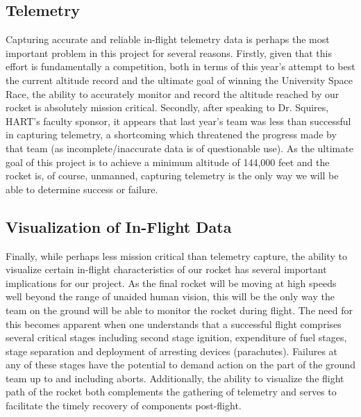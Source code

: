 \documentclass[onecolumn, draftclsnofoot,10pt, compsoc]{IEEEtran}
\begin{document}
\subsection{Telemetry}
Capturing accurate and reliable in-flight telemetry data is perhaps the most important problem in this project for several reasons. 
Firstly, given that this effort is fundamentally a competition, both in terms of this year's attempt to best the current altitude record and the ultimate goal of winning the University Space Race, the ability to accurately monitor and record the altitude reached by our rocket is absolutely mission critical. 
Secondly, after speaking to Dr. Squires, HART's faculty sponsor, it appears that last year's team was less than successful in capturing telemetry, a shortcoming which threatened the progress made by that team (as incomplete/inaccurate data is of questionable use). 
As the ultimate goal of this project is to achieve a minimum altitude of 144,000 feet and the rocket is, of course, unmanned, capturing telemetry is the only way we will be able to determine success or failure.

\subsection{Visualization of In-Flight Data}
Finally, while perhaps less mission critical than telemetry capture, the ability to visualize certain in-flight characteristics of our rocket has several important implications for our project.
As the final rocket will be moving at high speeds well beyond the range of unaided human vision, this will be the only way the team on the ground will be able to monitor the rocket during flight. 
The need for this becomes apparent when one understands that a successful flight comprises several critical stages including second stage ignition, expenditure of fuel stages, stage separation and deployment of arresting devices (parachutes). 
Failures at any of these stages have the potential to demand action on the part of the ground team up to and including aborts. 
Additionally, the ability to visualize the flight path of the rocket both complements the gathering of telemetry and serves to facilitate the timely recovery of components post-flight. 
\end{document}
